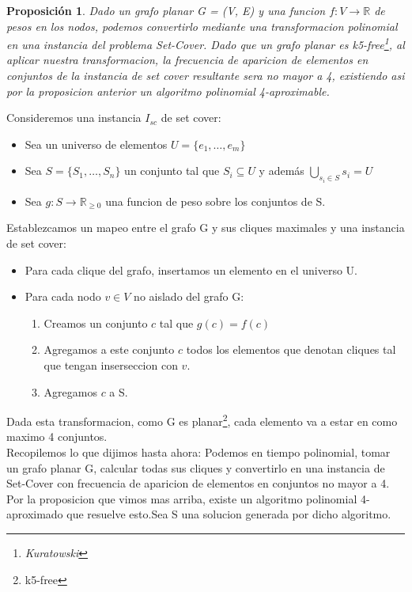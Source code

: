 \documentclass[10pt,a4paper]{article}
\newtheorem{proposition}{Proposici\'on}
\begin{document}
\begin{proposition}
    Dado un grafo planar G = (V, E) y una funcion $f:V \longrightarrow \mathbb{R}$ de pesos en los nodos, podemos convertirlo mediante una transformacion polinomial en una instancia del problema Set-Cover. Dado que un grafo planar es k5-free\footnote{Kuratowski}, al aplicar nuestra transformacion, la frecuencia de aparicion de elementos en conjuntos de la instancia de set cover resultante sera no mayor a 4, existiendo asi por la proposicion anterior un algoritmo polinomial 4-aproximable.
\end{proposition}

Consideremos una instancia $I_{sc}$ de set cover:
\begin{itemize}
    \item Sea un universo de elementos $U = \{e_1, \dots, e_m\}$
    \item Sea $S = \{S_1, \dots, S_n\}$ un conjunto tal que $S_i \subseteq U$ y además $\bigcup\limits_{s_i \in S} s_{i} = U$
    \item Sea $g:S \longrightarrow \mathbb{R}_{\geq 0}$ una funcion de peso sobre los conjuntos de S.
\end{itemize}

Establezcamos un mapeo entre el grafo G y sus cliques maximales y una instancia de set cover:
\begin{itemize}
    \item Para cada clique del grafo, insertamos un elemento en el universo U.
    \item Para cada nodo $v \in V$ no aislado del grafo G: 
    \begin{enumerate}
        \item Creamos un conjunto $c$ tal que $g(c) = f(c)$
        \item Agregamos a este conjunto $c$ todos los elementos que denotan cliques tal que tengan inserseccion con $v$.
        \item Agregamos $c$ a S.
    \end{enumerate}
\end{itemize}

Dada esta transformacion, como G es planar\footnote{k5-free}, cada elemento va a estar en como maximo 4 conjuntos. \\

Recopilemos lo que dijimos hasta ahora: Podemos en tiempo polinomial, tomar un grafo planar G, calcular todas sus cliques y convertirlo en una instancia de Set-Cover con frecuencia de aparicion de elementos en conjuntos no mayor a 4. Por la proposicion que vimos mas arriba, existe un algoritmo polinomial 4-aproximado que resuelve esto.Sea S una solucion generada por dicho algoritmo.\\
\end{document}
